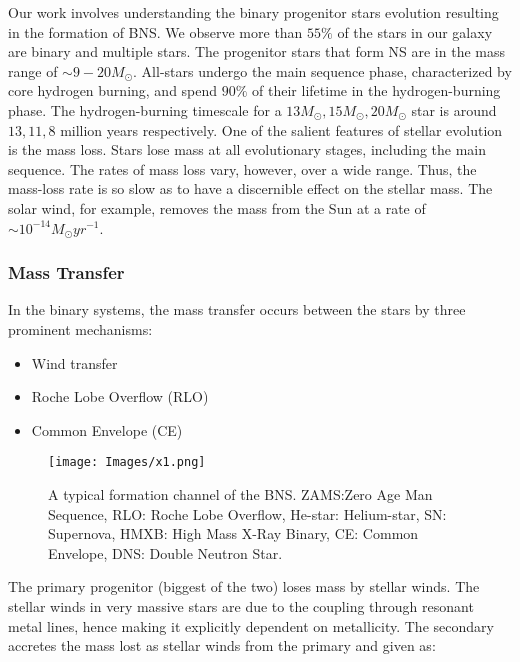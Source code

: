 \documentclass[preprint,12pt]{elsarticle}
\begin{document}
Our work involves understanding the binary progenitor stars evolution resulting in the formation of BNS. We observe more than $55\%$ of the stars in our galaxy are binary and multiple stars\citep{Sana:2012}. The progenitor stars that form NS are in the mass range of $\sim 9-20 M_{\odot}$. All-stars undergo the main sequence phase, characterized by core hydrogen burning, and spend $90\%$ of their lifetime in the hydrogen-burning phase. The hydrogen-burning timescale for a $13M_\odot, 15M_\odot, 20M_\odot$ star is  around $13, 11, 8$ million years respectively\citep{Woosley:2002}. One of the salient features of stellar evolution is the mass loss. Stars lose mass at all evolutionary stages, including the main sequence. The rates of mass loss vary, however, over a wide range. Thus, the mass-loss rate is so slow as to have a discernible effect on the stellar mass. The solar wind, for example, removes the mass from the Sun at a rate of $\sim 10^{-14}M_\odot yr^{-1}$\citep{Dina:2009}. 

\subsubsection{\textbf{Mass Transfer}}
In the binary systems, the mass transfer occurs between the stars by three prominent mechanisms:\newline
\begin{itemize}
    \item Wind transfer
    \item Roche Lobe Overflow (RLO)
    \item Common Envelope (CE)
\end{itemize}

\begin{figure}[htp]
    \centering
    \texttt{[image: Images/x1.png]}
    \caption{A typical formation channel of the BNS\citep{Tauris:2017}. ZAMS:Zero Age Man Sequence, RLO: Roche Lobe Overflow, He-star: Helium-star, SN: Supernova, HMXB: High Mass X-Ray Binary, CE: Common Envelope, DNS: Double Neutron Star.}
    \label{img:Formation channel DNS}
\end{figure}

\newline
The primary progenitor (biggest of the two) loses mass by stellar winds. The stellar winds in very massive stars are due to the coupling through resonant metal lines, hence making it explicitly dependent on metallicity. The secondary accretes the mass lost as stellar winds from the primary and given as\citep{Bondi:1944}:
\end{document}
